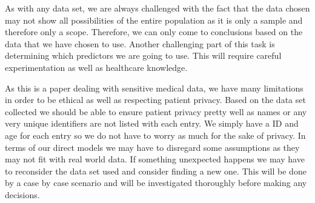 \documentclass[12pt]{article}
\begin{document}
As with any data set, we are always challenged with the fact that the data chosen may not show all possibilities of the entire population as it is only a sample and therefore only a scope. Therefore, we can only come to conclusions based on the data that we have chosen to use. Another challenging part of this task is determining which predictors we are going to use. This will require careful experimentation as well as healthcare knowledge.

As this is a paper dealing with sensitive medical data, we have many limitations in order to be ethical as well as respecting patient privacy. Based on the data set collected we should be able to ensure patient privacy pretty well as names or any very unique identifiers are not listed with each entry. We simply have a ID and age for each entry so we do not have to worry as much for the sake of privacy. In terms of our direct models we may have to disregard some assumptions as they may not fit with real world data. If something unexpected happens we may have to reconsider the data set used and consider finding a new one. This will be done by a case by case scenario and will be investigated thoroughly before making any decisions. 



\end{document}
